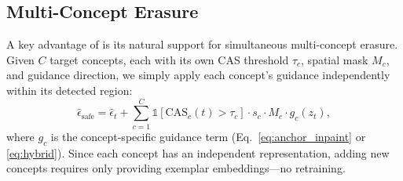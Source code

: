 \subsection{Multi-Concept Erasure}
\label{subsec:multi}

A key advantage of \ours{} is its natural support for simultaneous multi-concept erasure. Given $C$ target concepts, each with its own CAS threshold $\tau_c$, spatial mask $M_c$, and guidance direction, we simply apply each concept's guidance independently within its detected region:
\begin{equation}
    \hat{\epsilon}_\text{safe} = \hat{\epsilon}_t + \sum_{c=1}^{C} \mathbb{1}[\text{CAS}_c(t) > \tau_c] \cdot s_c \cdot M_c \cdot g_c(z_t),
\end{equation}
where $g_c$ is the concept-specific guidance term (Eq.~\ref{eq:anchor_inpaint} or \ref{eq:hybrid}). Since each concept has an independent representation, adding new concepts requires only providing exemplar embeddings---no retraining.
